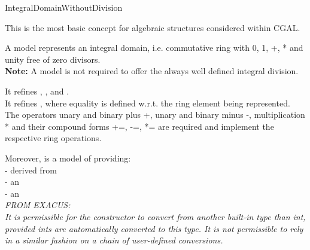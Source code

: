 \begin{ccRefConcept}{IntegralDomainWithoutDivision}


\ccDefinition

This is the most basic concept for algebraic structures considered within CGAL. 

A model   represents an integral domain,
i.e. commutative ring with 0, 1, +, * and unity free of zero divisors.\\ 
{\bf Note:} A model is not required to offer the always well defined integral division.

It refines , , 
and . \\ 
It refines , where equality is defined w.r.t. 
the ring element being represented. \\
The operators unary and binary plus +, unary and binary minus -, 
multiplication * and their compound forms +=, -=, *= are required and 
implement the respective ring operations.

Moreover,  is a model of 
 providing:\\ 
-  derived from  \\
-   an \\
-  an \\


{ \em \small FROM EXACUS: \\
It is permissible for the constructor 
to convert from another built-in type than int, provided ints are
automatically converted to this type. It is not permissible to 
rely in a similar fashion on a chain of user-defined conversions.
}



\ccRefines
{}\\
\\
\\
\\ 
\\


\end{ccRefConcept}
